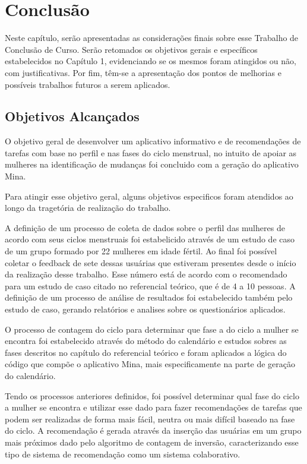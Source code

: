 \chapter[Conclusão]{Conclusão}
\label{ch:conclusao}

Neste capítulo, serão apresentadas as considerações finais sobre esse Trabalho de
Conclusão de Curso. Serão retomados os objetivos gerais e específicos estabelecidos no
Capítulo 1, evidenciando se os mesmos foram atingidos ou não, com justificativas. Por fim,
têm-se a apresentação dos pontos de melhorias e possíveis trabalhos futuros a serem aplicados.

\section{Objetivos Alcançados}

O objetivo geral de desenvolver um aplicativo informativo e de recomendações de tarefas 
com base no perfil e 
nas fases do ciclo menstrual, no intuito de apoiar as mulheres na identificação de mudanças 
foi concluido com a geração 
do aplicativo Mina.

Para atingir esse objetivo geral, alguns objetivos especificos foram atendidos ao longo da tragetória de 
realização do trabalho. 

A definição de um processo de coleta de dados sobre o perfil das mulheres de acordo com seus ciclos 
menstruais foi estabelicido através de um estudo de caso de um grupo formado por 22 mulheres em idade fértil. 
Ao final foi possível coletar o feedback de sete dessas usuárias que estiveram presentes 
desde o início da realização desse trabalho. Esse número está de acordo com o recomendado para um 
estudo de caso citado no referencial teórico, que é de 4 a 10 pessoas. A definição de um processo de 
análise de resultados foi estabelecido também pelo estudo de caso, gerando 
relatórios e analises sobre os questionários aplicados.

O processo de contagem do ciclo para determinar que fase a do ciclo a mulher se encontra foi estabelecido 
através do método do calendário e estudos sobres as fases descritos no capítulo do referencial teórico e foram 
aplicados a lógica do código que compõe o aplicativo Mina, mais especificamente na parte de geração do calendário.

Tendo os processos anteriores definidos, foi possível determinar qual fase do ciclo a mulher 
se encontra e utilizar esse dado para fazer recomendações de tarefas que podem 
ser realizadas de forma mais fácil, neutra ou mais difícil baseado na fase do ciclo. A 
recomendação é gerada 
através da inserção das usuárias em um grupo mais próximos dado pelo algoritmo de contagem de 
inversão, caracterizando esse tipo de sistema de recomendação como um sistema colaborativo.

